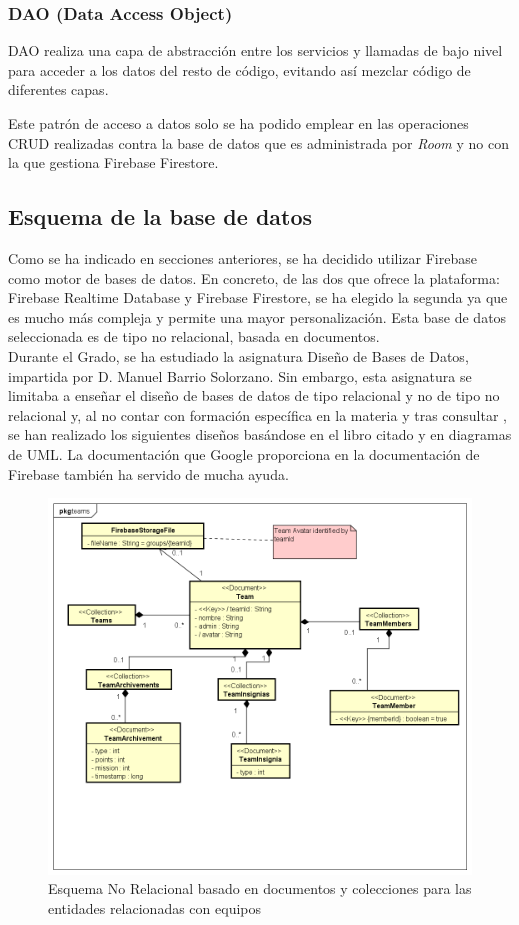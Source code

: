 \documentclass[twoside]{report}
\begin{document}
\subsubsection{DAO (Data Access Object)}

DAO realiza una capa de abstracción entre los servicios y llamadas de bajo nivel para acceder a los datos del resto de código, evitando así mezclar código de diferentes capas.

Este patrón de acceso a datos solo se ha podido emplear en las operaciones CRUD realizadas contra la base de datos que es administrada por \cite{roompersistence} \textit{Room} y no con la que gestiona Firebase Firestore.


\subsection{Esquema de la base de datos}
Como se ha indicado en secciones anteriores, se ha decidido utilizar Firebase como motor de bases de datos. En concreto, de las dos que ofrece la plataforma: Firebase Realtime Database y Firebase Firestore, se ha elegido la segunda ya que es mucho más compleja y permite una mayor personalización. Esta base de datos seleccionada es de tipo no relacional, basada en documentos. \\

Durante el Grado, se ha estudiado la asignatura Diseño de Bases de Datos, impartida por D. Manuel Barrio Solorzano. Sin embargo, esta asignatura se limitaba a enseñar el diseño de bases de datos de tipo relacional y no de tipo no relacional y, al no contar con formación específica en la materia y tras consultar \cite{databasedesign}, se han realizado los siguientes diseños basándose en el libro citado y en diagramas de UML. La \cite{fireference} documentación que Google proporciona en la documentación de Firebase también ha servido de mucha ayuda.

\begin{figure}[H]
\centering
\includegraphics[scale=0.5]{images/databaseNRteams}
\caption{Esquema No Relacional basado en documentos y colecciones para las entidades relacionadas con equipos}
\end{figure}
\end{document}
